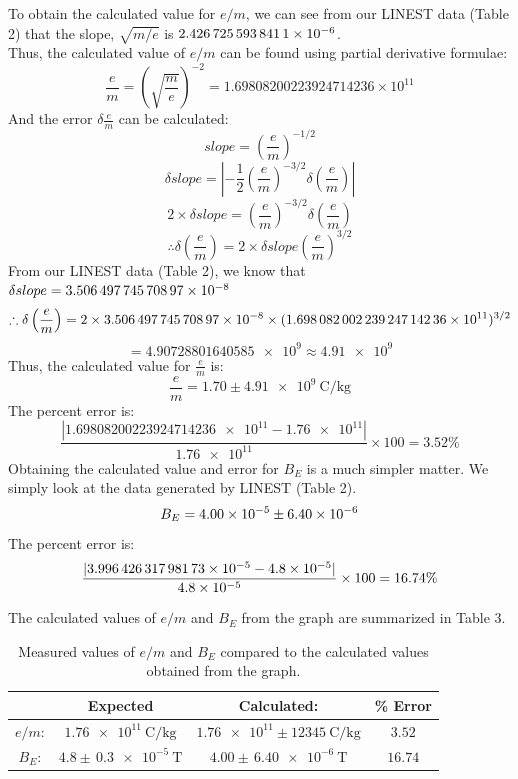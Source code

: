 \documentclass[letterpaper]{article}
\begin{document}
\noindent To obtain the calculated value for $e/m$, we can see from our LINEST data (Table 2) that the slope, $\sqrt{m/e}$ is
$\num{2.4267255938411E-06}$.\\
Thus, the calculated value of $e/m$ can be found using partial derivative formulae:
$$ \frac{e}{m} = \left(\sqrt{\frac{m}{e}}\right)^{-2} = 1.69808200223924714236 \times 10^{11} $$
And the error $\delta \frac{e}{m}$ can be calculated:
$$slope= \left(\frac{e}{m}\right)^{-1/2}$$
$$\delta slope = \left| -\frac{1}{2} \left(\frac{e}{m}\right)^{-3/2} \delta \left(\frac{e}{m}\right)\right|$$
$$ 2 \times \delta slope = \left(\frac{e}{m}\right)^{-3/2} \delta \left(\frac{e}{m}\right) $$
$$ \therefore \delta \left(\frac{e}{m}\right) = 2 \times \delta slope \left(\frac{e}{m}\right)^{3/2}$$
From our LINEST data (Table 2), we know that $\delta slope = \num{3.50649774570897E-08} $
$$ \therefore \delta \left(\frac{e}{m}\right) = 2 \times \num{3.50649774570897E-08} \times (\num{1.69808200223924714236e11})^{3/2}$$
$$= \num{4.90728801640585e9} \approx \num{4.91e9}$$
Thus, the calculated value for $\frac{e}{m}$ is:
$$\frac{e}{m}=1.70 \pm \SI{4.91e9}{\coulomb\per\kilogram}$$
The percent error is:
$$ \frac{|\num{1.69808200223924714236e11}-\num{1.76e11}|}{\num{1.76e11}}\times100 = 3.52\%$$
Obtaining the calculated value and error for $B_E$ is a much simpler matter. We simply
look at the data generated by LINEST (Table 2).
$$B_E = \num{4.00E-05}\pm \num{6.40E-06}$$
The percent error is:
$$ \frac{|\num{3.99642631798173E-05}-\num{4.8e-5}|}{\num{4.8e-5}}\times100 = 16.74\%$$

\vspace{1cm}
\noindent The calculated values of $e/m$ and $B_E$ from the graph are summarized in Table 3.
\begin{table}[H]
\centering
\begin{tabular}{c|c|c|c|}
                & Expected                      & Calculated:                                     & \% Error \\ \hline
$e/m$: & $\SI{1.76e11}{\coulomb\per\kilogram}$      & $\num{1.76e11} \pm \SI{12345}{\coulomb\per\kilogram}$  &    $3.52$  \\ \hline
$B_E$: & $4.8 \pm \,\SI{0.3e-5}{\tesla}$           & $4.00 \pm \,\SI{6.40e-6}{\tesla}$                    &   $16.74$  \\ \hline
\end{tabular}
\caption{Measured values of $e/m$ and $B_E$ compared to the calculated values obtained from the graph.}
\end{table}
\end{document}
